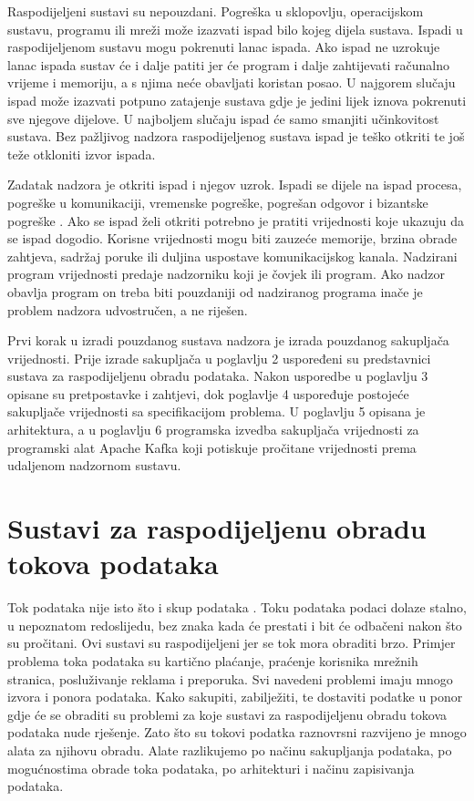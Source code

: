 \documentclass[utf8, diplomski, lmodern, numeric]{fer}
\begin{document}
Raspodijeljeni sustavi su nepouzdani. Pogreška u sklopovlju, operacijskom sustavu, programu ili mreži može izazvati ispad bilo kojeg dijela sustava. Ispadi u raspodijeljenom sustavu mogu pokrenuti lanac ispada. Ako ispad ne uzrokuje lanac ispada sustav će i dalje patiti jer će program i dalje zahtijevati računalno vrijeme i memoriju, a s njima neće obavljati koristan posao. U najgorem slučaju ispad može izazvati potpuno zatajenje sustava gdje je jedini lijek iznova pokrenuti sve njegove dijelove. U najboljem slučaju ispad će samo smanjiti učinkovitost sustava. Bez pažljivog nadzora raspodijeljenog sustava ispad je teško otkriti te još teže otkloniti izvor ispada.

Zadatak nadzora je otkriti ispad i njegov uzrok. Ispadi se dijele na ispad procesa, pogreške u komunikaciji, vremenske pogreške, pogrešan odgovor i bizantske pogreške \citep{rassus-manual}. Ako se ispad želi otkriti potrebno je pratiti vrijednosti koje ukazuju da se ispad dogodio. Korisne vrijednosti mogu biti zauzeće memorije, brzina obrade zahtjeva, sadržaj poruke ili duljina uspostave komunikacijskog kanala. Nadzirani program vrijednosti predaje nadzorniku koji je čovjek ili program. Ako nadzor obavlja program on treba biti pouzdaniji od nadziranog programa inače je problem nadzora udvostručen, a ne riješen.

Prvi korak u izradi pouzdanog sustava nadzora je izrada pouzdanog sakupljača vrijednosti. Prije izrade sakupljača u poglavlju 2 uspoređeni su predstavnici sustava za raspodijeljenu obradu podataka. Nakon usporedbe u poglavlju 3 opisane su pretpostavke i zahtjevi, dok poglavlje 4 uspoređuje postojeće sakupljače vrijednosti sa specifikacijom problema. U poglavlju 5 opisana je arhitektura, a u poglavlju 6 programska izvedba sakupljača vrijednosti za programski alat Apache Kafka koji potiskuje pročitane vrijednosti prema udaljenom nadzornom sustavu.



\chapter{Sustavi za raspodijeljenu obradu tokova podataka}

Tok podataka  nije isto što i skup podataka \citep{ilprints535}. Toku podataka podaci dolaze stalno, u nepoznatom redoslijedu, bez znaka kada će prestati i bit će odbačeni nakon što su pročitani. Ovi sustavi su raspodijeljeni jer se tok mora obraditi brzo. Primjer problema toka podataka su kartično plaćanje, praćenje korisnika mrežnih stranica, posluživanje reklama i preporuka. Svi navedeni problemi imaju mnogo izvora i ponora podataka. Kako sakupiti, zabilježiti, te dostaviti podatke u ponor gdje će se obraditi su problemi za koje sustavi za raspodijeljenu obradu tokova podataka nude rješenje. Zato što su tokovi podatka raznovrsni razvijeno je mnogo alata za njihovu obradu. Alate razlikujemo po načinu sakupljanja podataka, po mogućnostima obrade toka podataka, po arhitekturi i načinu zapisivanja podataka.
\end{document}
